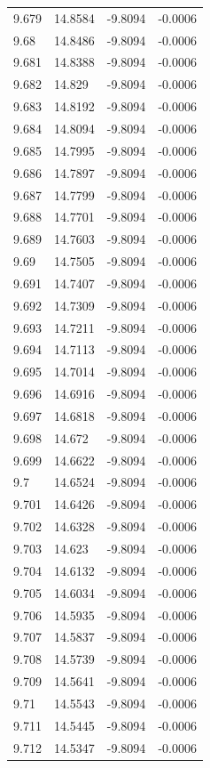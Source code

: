 \begin{tabular}{llll}
9.679 & 14.8584 & -9.8094 & -0.0006 \\
9.68 & 14.8486 & -9.8094 & -0.0006 \\
9.681 & 14.8388 & -9.8094 & -0.0006 \\
9.682 & 14.829 & -9.8094 & -0.0006 \\
9.683 & 14.8192 & -9.8094 & -0.0006 \\
9.684 & 14.8094 & -9.8094 & -0.0006 \\
9.685 & 14.7995 & -9.8094 & -0.0006 \\
9.686 & 14.7897 & -9.8094 & -0.0006 \\
9.687 & 14.7799 & -9.8094 & -0.0006 \\
9.688 & 14.7701 & -9.8094 & -0.0006 \\
9.689 & 14.7603 & -9.8094 & -0.0006 \\
9.69 & 14.7505 & -9.8094 & -0.0006 \\
9.691 & 14.7407 & -9.8094 & -0.0006 \\
9.692 & 14.7309 & -9.8094 & -0.0006 \\
9.693 & 14.7211 & -9.8094 & -0.0006 \\
9.694 & 14.7113 & -9.8094 & -0.0006 \\
9.695 & 14.7014 & -9.8094 & -0.0006 \\
9.696 & 14.6916 & -9.8094 & -0.0006 \\
9.697 & 14.6818 & -9.8094 & -0.0006 \\
9.698 & 14.672 & -9.8094 & -0.0006 \\
9.699 & 14.6622 & -9.8094 & -0.0006 \\
9.7 & 14.6524 & -9.8094 & -0.0006 \\
9.701 & 14.6426 & -9.8094 & -0.0006 \\
9.702 & 14.6328 & -9.8094 & -0.0006 \\
9.703 & 14.623 & -9.8094 & -0.0006 \\
9.704 & 14.6132 & -9.8094 & -0.0006 \\
9.705 & 14.6034 & -9.8094 & -0.0006 \\
9.706 & 14.5935 & -9.8094 & -0.0006 \\
9.707 & 14.5837 & -9.8094 & -0.0006 \\
9.708 & 14.5739 & -9.8094 & -0.0006 \\
9.709 & 14.5641 & -9.8094 & -0.0006 \\
9.71 & 14.5543 & -9.8094 & -0.0006 \\
9.711 & 14.5445 & -9.8094 & -0.0006 \\
9.712 & 14.5347 & -9.8094 & -0.0006 \\

\end{tabular}
